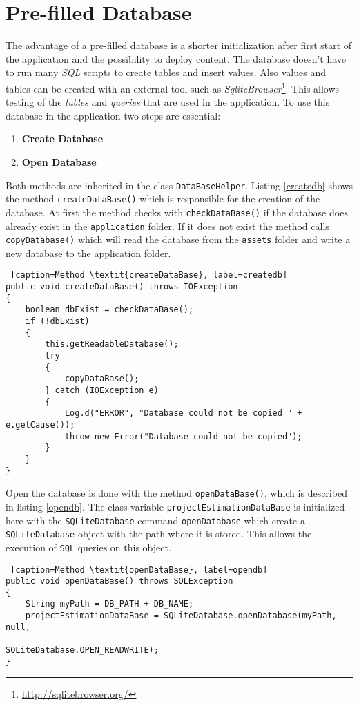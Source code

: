 \section{Pre-filled Database}\label{exDB}

The advantage of a pre-filled database is a shorter initialization after first start of the application and the possibility to deploy content. The database doesn't have to run many \textit{SQL} scripts to create tables and insert values. Also values and tables can be created with an external tool such as \textit{SqliteBrowser}\footnote{\url{http://sqlitebrowser.org/}}. This allows testing of the \textit{tables} and \textit{queries} that are used in the application. To use this database in the application two steps are essential:
\begin{enumerate}
	\item \textbf{Create Database}
	\item \textbf{Open Database}
\end{enumerate}
Both methods are inherited in the class \texttt{DataBaseHelper}. Listing \ref{createdb} shows the method \texttt{createDataBase()} which is responsible for the creation of the database. At first the method checks with \texttt{checkDataBase()} if the database does already exist in the \texttt{application} folder. If it does not exist the method calls \texttt{copyDatabase()} which will read the database from the \texttt{assets} folder and write a new database to the application folder.
\begin{lstlisting} [caption=Method \textit{createDataBase}, label=createdb] 
public void createDataBase() throws IOException
{
	boolean dbExist = checkDataBase();
	if (!dbExist)
	{
		this.getReadableDatabase();
		try
		{
			copyDataBase();
		} catch (IOException e)
		{
			Log.d("ERROR", "Database could not be copied " + e.getCause());
			throw new Error("Database could not be copied");
		}
	}
}
\end{lstlisting}
Open the database is done with the method \texttt{openDataBase()}, which is described in listing \ref{opendb}. The class variable \texttt{projectEstimationDataBase} is initialized here with the \texttt{SQLiteDatabase} command \texttt{openDatabase} which create a \texttt{SQLiteDatabase} object with the path where it is stored. This allows the execution of \texttt{SQL} queries on this object.
\begin{lstlisting} [caption=Method \textit{openDataBase}, label=opendb] 
public void openDataBase() throws SQLException
{
	String myPath = DB_PATH + DB_NAME;
	projectEstimationDataBase = SQLiteDatabase.openDatabase(myPath, null,
										 SQLiteDatabase.OPEN_READWRITE);
}
\end{lstlisting}
